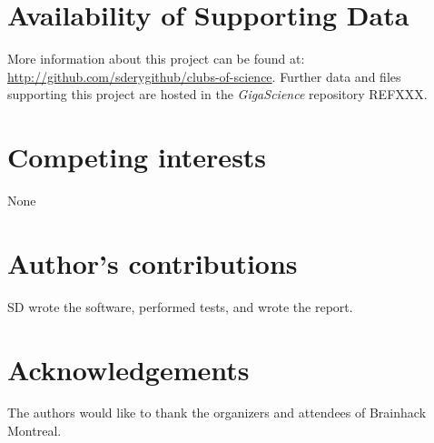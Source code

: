 \documentclass[twocolumn]{bmcart}%
\begin{document}
\begin{backmatter}

\section*{Availability of Supporting Data}
More information about this project can be found at: \url{http://github.com/sderygithub/clubs-of-science}. Further data and files supporting this project are hosted in the \emph{GigaScience} repository REFXXX.

\section*{Competing interests}
None

\section*{Author's contributions}
SD wrote the software, performed tests, and wrote the report.

\section*{Acknowledgements}
The authors would like to thank the organizers and attendees of
Brainhack Montreal.

  
  


\end{backmatter}
\end{document}
